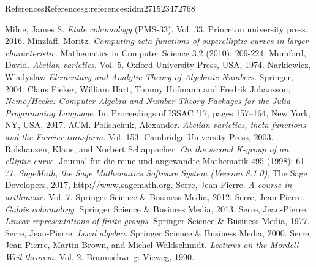 \documentclass[oneside,10pt,]{book}
\numberwithin{equation}{section}
\begin{document}
\begin{references-chapter-numberless}{References}{}{References}{}{}{g:references:idm271523472768}
\begin{thebibliography}{9}
\hypertarget{x:biblio:bib-milne-etale}{}Milne, James S. \textit{Etale cohomology} (PMS-33). Vol. 33. Princeton university press, 2016.
\hypertarget{x:biblio:bib-minzlaff}{}Minzlaff, Moritz. \textit{Computing zeta functions of superelliptic curves in larger characteristic}. Mathematics in Computer Science 3.2 (2010): 209-224.
\hypertarget{x:biblio:bib-mumford-abvar}{}Mumford, David. \textit{Abelian varieties}. Vol. 5. Oxford University Press, USA, 1974.
\hypertarget{x:biblio:bib-narkiewicz}{}Narkiewicz, Wladyslaw  \textit{Elementary and Analytic Theory of Algebraic Numbers}. Springer, 2004.
\hypertarget{x:biblio:bib-nemo}{}Claus Fieker, William Hart, Tommy Hofmann and Fredrik Johansson, \textit{Nemo\slash{}Hecke: Computer Algebra and Number Theory Packages for the Julia Programming Language}. In: Proceedings of ISSAC '17, pages 157–164, New York, NY, USA, 2017. ACM.
\hypertarget{x:biblio:bib-polishchuck}{}Polishchuk, Alexander. \textit{Abelian varieties, theta functions and the Fourier transform}. Vol. 153. Cambridge University Press, 2003.
\hypertarget{x:biblio:bib-rolshausen}{}Rolshausen, Klaus, and Norbert Schappacher.  \textit{On the second K-group of an elliptic curve.}  Journal für die reine und angewandte Mathematik 495 (1998): 61-77.
\hypertarget{x:biblio:bib-sage}{}\textit{SageMath, the Sage Mathematics Software System (Version 8.1.0)}, The Sage Developers, 2017, \url{http://www.sagemath.org}.
\hypertarget{x:biblio:bib-serre-course}{}Serre, Jean-Pierre. \textit{A course in arithmetic}. Vol. 7. Springer Science \& Business Media, 2012.
\hypertarget{x:biblio:bib-serre-gal-coh}{}Serre, Jean-Pierre. \textit{Galois cohomology}. Springer Science \& Business Media, 2013.
\hypertarget{x:biblio:bib-serre-linear-reps}{}Serre, Jean-Pierre. \textit{Linear representations of finite groups}. Springer Science \& Business Media, 1977.
\hypertarget{x:biblio:bib-serre-local-alg}{}Serre, Jean-Pierre. \textit{Local algebra}. Springer Science \& Business Media, 2000.
\hypertarget{x:biblio:bib-serre-mordell-weil}{}Serre, Jean-Pierre, Martin Brown, and Michel Waldschmidt. \textit{Lectures on the Mordell-Weil theorem}. Vol. 2. Braunschweig: Vieweg, 1990.

\end{thebibliography}
\end{references-chapter-numberless}
\end{document}
